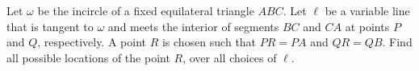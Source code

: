 Let $\omega$ be the incircle of a fixed equilateral triangle $ABC$. Let $\ell$ be a variable line that is tangent to $\omega$ and meets the interior of segments $BC$ and $CA$ at points $P$ and $Q$, respectively. A point $R$ is chosen such that $PR=PA$ and $QR=QB$. Find all possible locations of the point $R$, over all choices of $\ell$.
